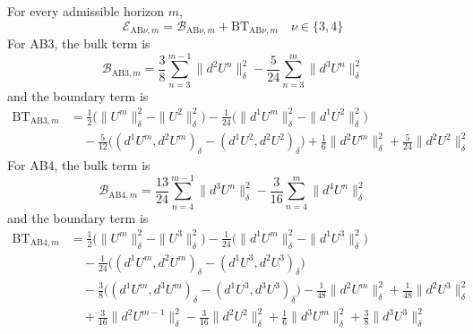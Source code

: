 \documentclass[11pt]{article}
\begin{document}
\begin{lem}
\label{lem:ab-exact-energy-decompositions}
For every admissible horizon \(m\),
\begin{equation}
\mathcal E_{\mathrm{AB}\nu,m}
=\mathcal B_{\mathrm{AB}\nu,m}+\mathrm{BT}_{\mathrm{AB}\nu,m}
\quad \nu\in\{3,4\} \label{eq:ab-bulk-boundary-decomposition}
\end{equation}
For AB3, the bulk term is
\begin{equation}
\mathcal B_{\mathrm{AB3},m}
=\frac38\sum_{n=3}^{m-1}\|d^2U^n\|_{\delta}^2
-\frac5{24}\sum_{n=3}^{m}\|d^3U^n\|_{\delta}^2
\label{eq:ab3-energy-bulk}
\end{equation}
and the boundary term is
\begin{align}
\mathrm{BT}_{\mathrm{AB3},m}
&=\frac12\bigl(\|U^m\|_{\delta}^2-\|U^2\|_{\delta}^2\bigr)
-\frac1{24}\bigl(\|d^1U^m\|_{\delta}^2
-\|d^1U^2\|_{\delta}^2\bigr) \label{eq:ab3-energy-boundary-main}\\
&\quad-\frac5{12}\bigl((d^1U^m,d^2U^m)_{\delta}
-(d^1U^2,d^2U^2)_{\delta}\bigr)
+\frac16\|d^2U^m\|_{\delta}^2
+\frac5{24}\|d^2U^2\|_{\delta}^2
\label{eq:ab3-energy-boundary-increments}
\end{align}
For AB4, the bulk term is
\begin{equation}
\mathcal B_{\mathrm{AB4},m}
=\frac{13}{24}\sum_{n=4}^{m-1}\|d^3U^n\|_{\delta}^2
-\frac3{16}\sum_{n=4}^{m}\|d^4U^n\|_{\delta}^2
\label{eq:ab4-energy-bulk}
\end{equation}
and the boundary term is
\begin{align}
\mathrm{BT}_{\mathrm{AB4},m}
&=\frac12\bigl(\|U^m\|_{\delta}^2-\|U^3\|_{\delta}^2\bigr)
-\frac1{24}\bigl(\|d^1U^m\|_{\delta}^2
-\|d^1U^3\|_{\delta}^2\bigr) \label{eq:ab4-energy-boundary-main}\\
&\quad-\frac1{24}\bigl((d^1U^m,d^2U^m)_{\delta}
-(d^1U^3,d^2U^3)_{\delta}\bigr) \label{eq:ab4-energy-boundary-second}\\
&\quad-\frac38\bigl((d^1U^m,d^3U^m)_{\delta}
-(d^1U^3,d^3U^3)_{\delta}\bigr)
-\frac1{48}\|d^2U^m\|_{\delta}^2
+\frac1{48}\|d^2U^3\|_{\delta}^2
\label{eq:ab4-energy-boundary-third}\\
&\quad+\frac3{16}\|d^2U^{m-1}\|_{\delta}^2
-\frac3{16}\|d^2U^2\|_{\delta}^2
+\frac16\|d^3U^m\|_{\delta}^2
+\frac38\|d^3U^3\|_{\delta}^2
\label{eq:ab4-energy-boundary-fourth}
\end{align}
\end{lem}
\end{document}
